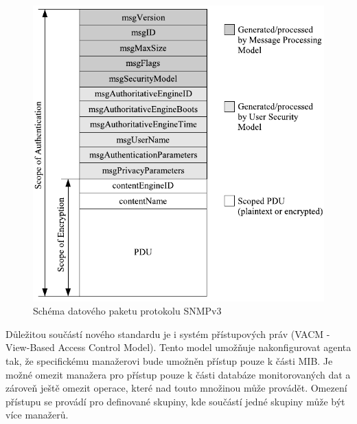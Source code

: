 \begin{figure}[htp]
	\begin{center}
		\includegraphics{obrazky/02_snmpv3_pdu.pdf}
		\caption{Schéma datového paketu protokolu SNMPv3}
		\label{obr_snmp4}
	\end{center}
\end{figure}


Důležitou součástí nového standardu je i systém přístupových práv (VACM - View-Based Access Control Model). Tento model umožňuje nakonfigurovat agenta tak, 
že specifickému manažerovi bude umožněn přístup pouze k části MIB. Je možné omezit manažera pro přístup pouze k části databáze monitorovaných dat a 
zároveň ještě omezit operace, které nad touto množinou může provádět. Omezení přístupu se provádí pro definované skupiny, kde součástí jedné skupiny může být
více manažerů.


